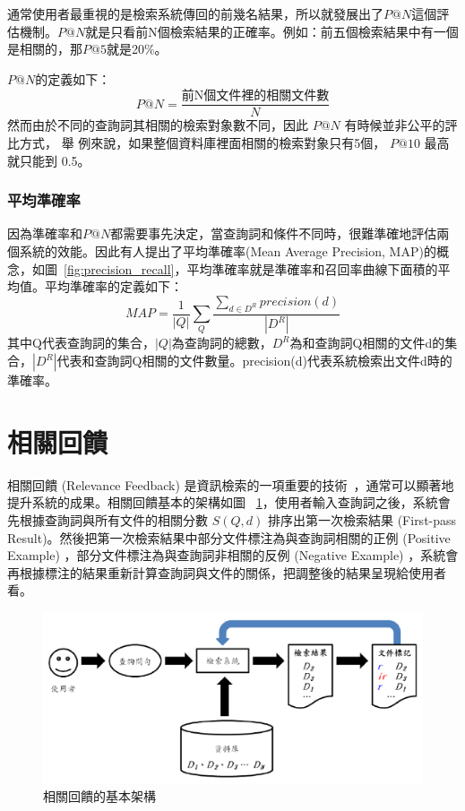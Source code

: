 通常使用者最重視的是檢索系統傳回的前幾名結果，所以就發展出了$P@N$這個評估機制。$P@N$就是只看前N個檢索結果的正確率。例如：前五個檢索結果中有一個是相關的，那$P@5$就是20\%。

$P@N$的定義如下：
\[
P@N=\frac{\text{前N個文件裡的相關文件數}}{N}
\]
 然而由於不同的查詢詞其相關的檢索對象數不同，因此 $P@N$ 有時候並非公平的評比方式， 舉
 例來說，如果整個資料庫裡面相關的檢索對象只有5個， $P@10$ 最高就只能到
 0.5。
\subsubsection{平均準確率~\cite{garofolo2000trec}}

因為準確率和$P@N$都需要事先決定，當查詢詞和條件不同時，很難準確地評估兩個系統的效能。因此有人提出了平均準確率(Mean Average Precision, MAP)的概念，如圖~\ref{fig:precision_recall}，平均準確率就是準確率和召回率曲線下面積的平均值。平均準確率的定義如下：
\begin{equation}
MAP = \frac{1}{|Q|} \sum_Q \frac{\sum_{d \in D^R}precision(d)}{|D^R|}
\end{equation}
其中Q代表查詢詞的集合，$|Q|$為查詢詞的總數，$D^R$為和查詢詞Q相關的文件d的集合，$|D^R|$代表和查詢詞Q相關的文件數量。precision(d)代表系統檢索出文件d時的準確率。

\section{相關回饋}
相關回饋 (Relevance Feedback) 是資訊檢索的一項重要的技術~\cite{ruthven2003survey}，通常可以顯著地提升系統的成果。相關回饋基本的架構如圖 ~\ref{fig:chap2_prf}，使用者輸入查詢詞之後，系統會先根據查詢詞與所有文件的相關分數 $S(Q, d)$ 排序出第一次檢索結果 (First-pass Result)。然後把第一次檢索結果中部分文件標注為與查詢詞相關的正例 (Positive Example) ，部分文件標注為與查詢詞非相關的反例 (Negative Example)
，系統會再根據標注的結果重新計算查詢詞與文件的關係，把調整後的結果呈現給使用者看。
\begin{figure}
\centering
\includegraphics[scale=0.7]{images/chap2_prf.png}
\caption{相關回饋的基本架構} \label{fig:chap2_prf}
\end{figure}


